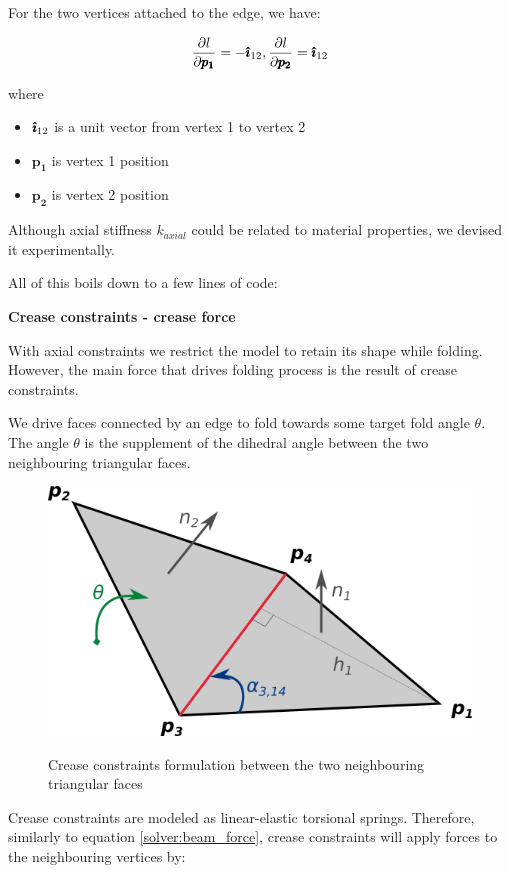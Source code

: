 For the two vertices attached to the edge, we have:

$$ \frac{\partial l}{\partial \pmb{p_{1}}} = -\pmb{\hat{\imath}}_{12}, \frac{\partial l}{\partial \pmb{p_{2}}} = \pmb{\hat{\imath}}_{12} $$

where
\begin{itemize}
	\item $\pmb{\hat{\imath}}_{12}$ is a unit vector from vertex 1 to vertex 2
	\item $\pmb{p_{1}}$ is vertex 1 position
	\item $\pmb{p_{2}}$ is vertex 2 position
\end{itemize}

Although axial stiffness $k_{axial}$ could be related to material properties, we devised it experimentally.

All of this boils down to a few lines of code:




\medskip
\textbf{Crease constraints - crease force}

With axial constraints we restrict the model to retain its shape while folding.
However, the main force that drives folding process is the result of crease constraints.
\smallskip

We drive faces connected by an edge to fold towards some target fold angle $\theta$.
The angle $\theta$ is the supplement of the dihedral angle between the two neighbouring triangular faces.

\begin{figure}[H]
	\caption{Crease constraints formulation between the two neighbouring triangular faces}
    \centering
	\includegraphics[width=.6\linewidth]{assets/3-crease_force_face.png}
	\label{solver:crease_force_face}
\end{figure}

Crease constraints are modeled as linear-elastic torsional springs.
Therefore, similarly to equation \eqref{solver:beam_force}, crease constraints will apply forces to the neighbouring
vertices by:

